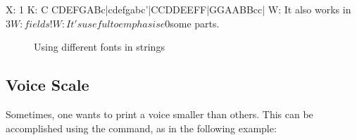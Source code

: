 \documentclass[a4paper,12pt]{book}
\begin{document}
\begin{abcsource}
X: 1
K: C
CDEFGABc|cdefgabc'|CCDDEEFF|GGAABBcc|
W: It also works in $3W: fields!
W: It's useful to emphasise $0some parts.
\end{abcsource}

\begin{center}
\begin{figure}[htbp]
\caption{Using different fonts in strings}
\label{fig:setfont}
\end{figure}
\end{center}









\subsection{Voice Scale}
\label{sec:voicescale}

Sometimes, one wants to print a voice smaller than others. This can be
accomplished using the  command, as in the
following example:
\end{document}
